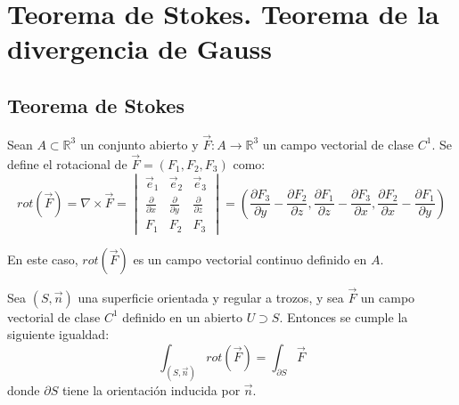 \section{Teorema de Stokes. Teorema de la divergencia de Gauss}


\subsection{Teorema de Stokes}

\begin{definición} [Rotacional]
    Sean $A \subset \mathbb{R}^3$ un conjunto abierto y $\vec{F} : A \to \mathbb{R}^3$ un campo vectorial de clase $C^1$. Se define el rotacional de $\vec{F} = (F_1,F_2,F_3)$ como:
    $$ rot(\vec{F}) = \nabla \times \vec{F} = \begin{vmatrix}
        \vec{e}_1 & \vec{e}_2 & \vec{e}_3 \\
        \frac{\partial}{\partial x} & \frac{\partial}{\partial y} & \frac{\partial}{\partial z} \\
        F_1 & F_2 & F_3
        \end{vmatrix} = \left( \frac{\partial F_3}{\partial y} - \frac{\partial F_2}{\partial z}, \frac{\partial F_1}{\partial z} - \frac{\partial F_3}{\partial x}, \frac{\partial F_2}{\partial x} - \frac{\partial F_1}{\partial y} \right)
    $$
\end{definición}

\begin{observación}
    En este caso, $rot(\vec{F})$ es un campo vectorial continuo definido en $A$.
\end{observación}


\begin{teorema} 
    Sea $(S, \vec{n})$ una superficie orientada y regular a trozos, y sea $\vec{F}$ un campo vectorial de clase $C^1$ definido en un abierto $U \supset S$. Entonces se cumple la siguiente igualdad:
    $$ \int_{(S, \vec{n})} rot(\vec{F}) = \int_{\partial S} \vec{F} $$
    donde $\partial S$ tiene la orientación inducida por $\vec{n}$.
\end{teorema}

